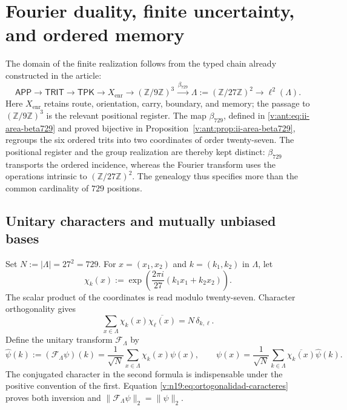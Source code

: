 \section{Fourier duality, finite uncertainty, and ordered memory}
\label{v:n19:sec:incertidumbre-fourier}

The domain of the finite realization follows from the typed chain already
constructed in the article:
\begin{equation}
 \mathsf{APP}\longrightarrow\mathsf{TRIT}\longrightarrow\mathsf{TPK}
 \longrightarrow X_{\mathrm{enr}}
 \longrightarrow (\mathbb Z/9\mathbb Z)^3
 \xrightarrow{\,\beta_{729}\,}
 \Lambda:=(\mathbb Z/27\mathbb Z)^2
 \longrightarrow \ell^2(\Lambda).
 \label{v:n19:eq:cadena-tipificada}
\end{equation}
Here \(X_{\mathrm{enr}}\) retains route, orientation, carry, boundary,
and memory; the passage to \((\mathbb Z/9\mathbb Z)^3\) is the relevant
positional register. The map \(\beta_{729}\), defined in
\eqref{v:ant:eq:ii-area-beta729} and proved bijective in
Proposition~\ref{v:ant:prop:ii-area-beta729}, regroups the six ordered
trits into two coordinates of order twenty-seven. The positional register
and the group realization are thereby kept distinct: \(\beta_{729}\)
transports the ordered incidence, whereas the Fourier transform uses the
operations intrinsic to \((\mathbb Z/27\mathbb Z)^2\). The genealogy thus
specifies more than the common cardinality of \(729\) positions.

\subsection{Unitary characters and mutually unbiased bases}
\label{v:n19:sec:caracteres-mub}

Set \(N:=|\Lambda|=27^2=729\). For
\(x=(x_1,x_2)\) and \(k=(k_1,k_2)\) in \(\Lambda\), let
\begin{equation}
 \chi_k(x):=
 \exp\!\left(\frac{2\pi i}{27}(k_1x_1+k_2x_2)\right).
 \label{v:n19:eq:caracteres}
\end{equation}
The scalar product of the coordinates is read modulo twenty-seven.
Character orthogonality gives
\begin{equation}
 \sum_{x\in\Lambda}\chi_k(x)\overline{\chi_{\ell}(x)}
 =N\,\delta_{k,\ell}.
 \label{v:n19:eq:ortogonalidad-caracteres}
\end{equation}
Define the unitary transform \(\mathcal F_\Lambda\) by
\begin{equation}
 \widehat\psi(k):=(\mathcal F_\Lambda\psi)(k)
 =\frac1{\sqrt N}\sum_{x\in\Lambda}\chi_k(x)\psi(x),
 \qquad
 \psi(x)=\frac1{\sqrt N}\sum_{k\in\Lambda}
 \overline{\chi_k(x)}\widehat\psi(k).
 \label{v:n19:eq:fourier-inversion}
\end{equation}
The conjugated character in the second formula is indispensable under
the positive convention of the first. Equation
\eqref{v:n19:eq:ortogonalidad-caracteres} proves both inversion and
\(\|\mathcal F_\Lambda\psi\|_2=\|\psi\|_2\).

